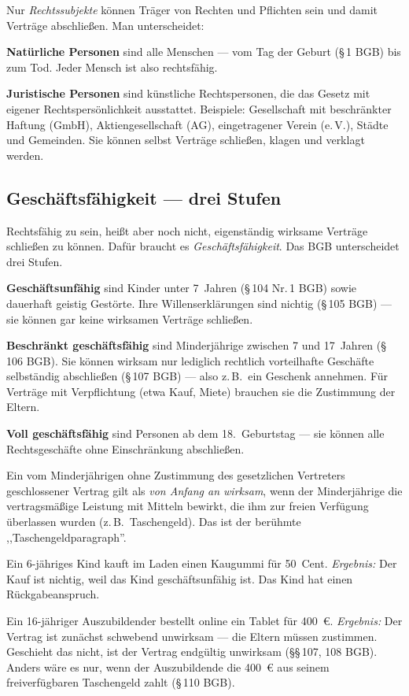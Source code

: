 \documentclass[11pt, a4paper]{article}
\begin{document}
Nur \emph{Rechtssubjekte} können Träger von Rechten und Pflichten sein und damit
Verträge abschließen. Man unterscheidet:

\textbf{Natürliche Personen} sind alle Menschen --- vom Tag der Geburt (§\,1 BGB) bis
zum Tod. Jeder Mensch ist also rechtsfähig.

\textbf{Juristische Personen} sind künstliche Rechts­personen, die das Gesetz mit
eigener Rechtspersönlichkeit ausstattet. Beispiele: Gesellschaft mit beschränkter
Haftung (GmbH), Aktiengesellschaft (AG), eingetragener Verein (e.\,V.), Städte und
Gemeinden. Sie können selbst Verträge schließen, klagen und verklagt werden.

\subsection{Geschäftsfähigkeit --- drei Stufen}

Rechtsfähig zu sein, heißt aber noch nicht, eigenständig wirksame Verträge schließen
zu können. Dafür braucht es \emph{Geschäfts­fähigkeit}. Das BGB unterscheidet drei
Stufen.

\textbf{Geschäftsunfähig} sind Kinder unter 7~Jahren (§\,104 Nr.\,1 BGB) sowie dauerhaft
geistig Gestörte. Ihre Willenserklärungen sind nichtig (§\,105 BGB) --- sie können
gar keine wirksamen Verträge schließen.

\textbf{Beschränkt geschäftsfähig} sind Minderjährige zwischen 7 und 17~Jahren
(§\,106 BGB). Sie können wirksam nur lediglich rechtlich vorteilhafte Geschäfte
selbständig abschließen (§\,107 BGB) --- also z.\,B.\ ein Geschenk annehmen. Für
Verträge mit Verpflichtung (etwa Kauf, Miete) brauchen sie die Zustimmung der Eltern.

\textbf{Voll geschäftsfähig} sind Personen ab dem 18.~Geburtstag --- sie können alle
Rechtsgeschäfte ohne Einschränkung abschließen.

\begin{merksatz}[title={§\,110 BGB Taschengeldparagraph}]
Ein vom Minderjährigen ohne Zustimmung des gesetzlichen Vertreters geschlossener Vertrag
gilt als \emph{von Anfang an wirksam}, wenn der Minderjährige die vertragsmäßige
Leistung mit Mitteln bewirkt, die ihm zur freien Verfügung überlassen wurden
(z.\,B.\ Taschengeld). Das ist der berühmte ,,Taschengeld\-paragraph''.
\end{merksatz}

\begin{beispiel}
Ein 6-jähriges Kind kauft im Laden einen Kaugummi für 50~Cent. \emph{Ergebnis:} Der
Kauf ist nichtig, weil das Kind geschäftsunfähig ist. Das Kind hat einen Rückgabeanspruch.

Ein 16-jähriger Auszubildender bestellt online ein Tablet für 400~€. \emph{Ergebnis:}
Der Vertrag ist zunächst schwebend unwirksam --- die Eltern müssen zustimmen. Geschieht
das nicht, ist der Vertrag endgültig unwirksam (§§\,107, 108 BGB). Anders wäre es nur,
wenn der Auszubildende die 400~€ aus seinem freiverfügbaren Taschengeld zahlt
(§\,110 BGB).
\end{beispiel}
\end{document}
